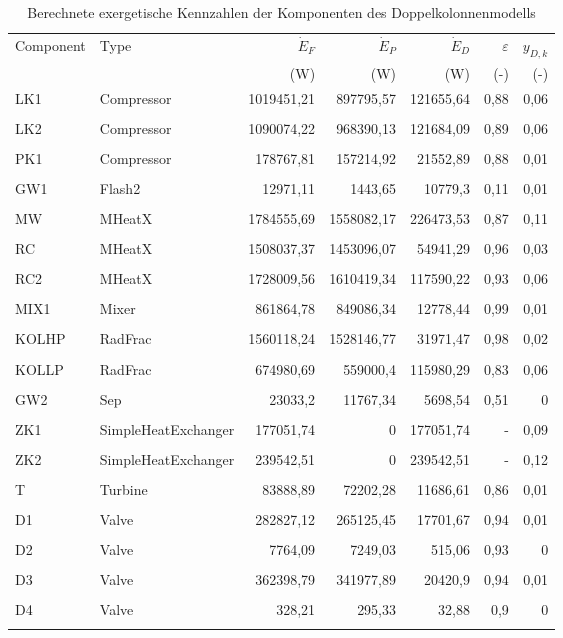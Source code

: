 \begin{longtable}{llrrrrr}
\caption{Berechnete exergetische Kennzahlen der Komponenten des Doppelkolonnenmodells} \\
\hline
Component & Type & $\dot{E}_F$ & $\dot{E}_P$ & $\dot{E}_D$ & $\varepsilon$ & $y_{D,k}$ \\
 &  & (W) & (W) & (W) & (-) & (-) \\
\hline
LK1 & Compressor & 1019451,21 & 897795,57 & 121655,64 & 0,88 & 0,06 \\\\
LK2 & Compressor & 1090074,22 & 968390,13 & 121684,09 & 0,89 & 0,06 \\\\
PK1 & Compressor & 178767,81 & 157214,92 & 21552,89 & 0,88 & 0,01 \\\\
GW1 & Flash2 & 12971,11 & 1443,65 & 10779,3 & 0,11 & 0,01 \\\\
MW & MHeatX & 1784555,69 & 1558082,17 & 226473,53 & 0,87 & 0,11 \\\\
RC & MHeatX & 1508037,37 & 1453096,07 & 54941,29 & 0,96 & 0,03 \\\\
RC2 & MHeatX & 1728009,56 & 1610419,34 & 117590,22 & 0,93 & 0,06 \\\\
MIX1 & Mixer & 861864,78 & 849086,34 & 12778,44 & 0,99 & 0,01 \\\\
KOLHP & RadFrac & 1560118,24 & 1528146,77 & 31971,47 & 0,98 & 0,02 \\\\
KOLLP & RadFrac & 674980,69 & 559000,4 & 115980,29 & 0,83 & 0,06 \\\\
GW2 & Sep & 23033,2 & 11767,34 & 5698,54 & 0,51 & 0 \\\\
ZK1 & SimpleHeatExchanger & 177051,74 & 0 & 177051,74 & - & 0,09 \\\\
ZK2 & SimpleHeatExchanger & 239542,51 & 0 & 239542,51 & - & 0,12 \\\\
T & Turbine & 83888,89 & 72202,28 & 11686,61 & 0,86 & 0,01 \\\\
D1 & Valve & 282827,12 & 265125,45 & 17701,67 & 0,94 & 0,01 \\\\
D2 & Valve & 7764,09 & 7249,03 & 515,06 & 0,93 & 0 \\\\
D3 & Valve & 362398,79 & 341977,89 & 20420,9 & 0,94 & 0,01 \\\\
D4 & Valve & 328,21 & 295,33 & 32,88 & 0,9 & 0 \\\\
\hline
\end{longtable}